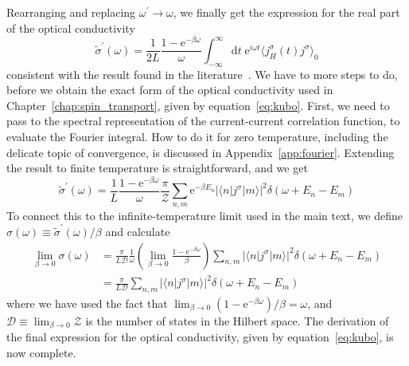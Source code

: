 Rearranging and replacing \(\omega^{\prime} \to \omega \), we finally get the expression for the real part of the 
optical conductivity
\begin{equation}
    \tilde{\sigma}^{\prime}(\omega ) = \frac{1}{2L} \frac{1-\mathrm{e}^{-\beta \omega }}{\omega } \int_{-\infty}^{\infty}  \mathrm{d}t \; \mathrm{e}^{i \omega t} \langle j^{\sigma }_{H}(t) j^{\sigma } \rangle_0 
\end{equation}
consistent with the result found in the literature~\autocite{Mahan2000,Gohmann2022,Sirker2020}. We have to more steps
to do, before we obtain the exact form of the optical conductivity used in Chapter~\ref{chap:spin_transport}, given by
equation~\eqref{eq:kubo}. First, we need to pass to the spectral representation of the current-current correlation function,
to evaluate the Fourier integral. How to do it for zero temperature, including the delicate topic of convergence, is discussed
in Appendix~\ref{app:fourier}. Extending the result to finite temperature is straightforward, and we get
\begin{equation}
    \tilde{\sigma}^{\prime}(\omega ) = \frac{1}{L} \frac{1-\mathrm{e}^{-\beta \omega }}{\omega } \frac{\pi }{\mathcal{Z} }
    \sum_{n,m} \mathrm{e}^{-\beta E_n} \left| \langle n | j^{\sigma } | m \rangle \right|^2 \delta (\omega  + E_n - E_m)
\end{equation}
To connect this to the infinite-temperature limit used in the main text, we define 
\(\sigma (\omega )\equiv \tilde{\sigma }^{\prime} (\omega )/\beta \) and calculate 
\begin{align}
\lim_{\beta  \to 0} \sigma(\omega ) &= \frac{\pi}{L \mathcal{D} } \frac{1}{\omega }\left( \lim_{\beta  \to 0} \frac{1-\mathrm{e}^{-\beta \omega } }{\beta } \right) 
\sum _{n,m} \left| \langle n | j^{\sigma } | m \rangle \right|^2 \delta (\omega  + E_n - E_m) \nonumber\\
&= \frac{\pi}{L \mathcal{D} } \sum _{n,m} \left| \langle n | j^{\sigma } | m \rangle \right|^2 \delta (\omega  + E_n - E_m)
\end{align}
where we have used the fact that \(\lim_{\beta  \to 0} (1-\mathrm{e}^{-\beta \omega })/\beta = \omega \), and
\(\mathcal{D} \equiv \lim_{\beta  \to 0} \mathcal{Z} \) is the number of states in the Hilbert space. 
The derivation of the final expression for the optical conductivity, given by equation~\eqref{eq:kubo}, is now complete.